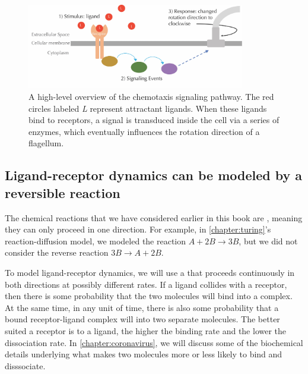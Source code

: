 \begin{figure}[h]
\centering
\mySfFamily
\includegraphics[width = 0.85\textwidth]{../images_CMYK/chemotaxis_signal}
\caption{A high-level overview of the chemotaxis signaling pathway. The red circles labeled \textit{L} represent attractant ligands. When these ligands bind to receptors, a signal is transduced inside the cell via a series of enzymes, which eventually influences the rotation direction of a flagellum.}
\label{fig:chemotaxis_signal}
\end{figure}

\FloatBarrier
\nopagebreak
{}
\subsection{Ligand-receptor dynamics can be modeled by a reversible reaction}

The chemical reactions that we have considered earlier in this book are , meaning they can only proceed in one direction. For example, in \autoref{chapter:turing}'s reaction-diffusion model, we modeled the reaction $A + 2B \rightarrow 3B$, but we did not consider the reverse reaction $3B \rightarrow A + 2B$.

To model ligand-receptor dynamics, we will use a  that proceeds continuously in both directions at possibly different rates. If a ligand collides with a receptor, then there is some probability that the two molecules will bind into a complex. At the same time, in any unit of time, there is also some probability that a bound receptor-ligand complex will  into two separate molecules. The better suited a receptor is to a ligand, the higher the binding rate and the lower the dissociation rate. In \autoref{chapter:coronavirus}, we will discuss some of the biochemical details underlying what makes two molecules more or less likely to bind and disssociate.\\

